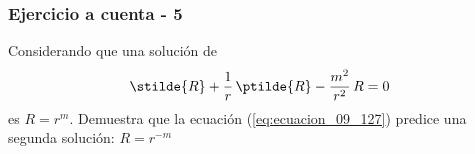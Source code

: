 \begin{frame}
\frametitle{Ejercicio a cuenta - 5}
Considerando que una solución de
\begin{align*}
\stilde{R} + \dfrac{1}{r} \, \ptilde{R} - \dfrac{m^{2}}{r^{2}} \, R = 0
\end{align*}
es $R = r^{m}$. Demuestra que la ecuación (\ref{eq:ecuacion_09_127}) predice una segunda solución: $R = r^{-m}$
\end{frame}

